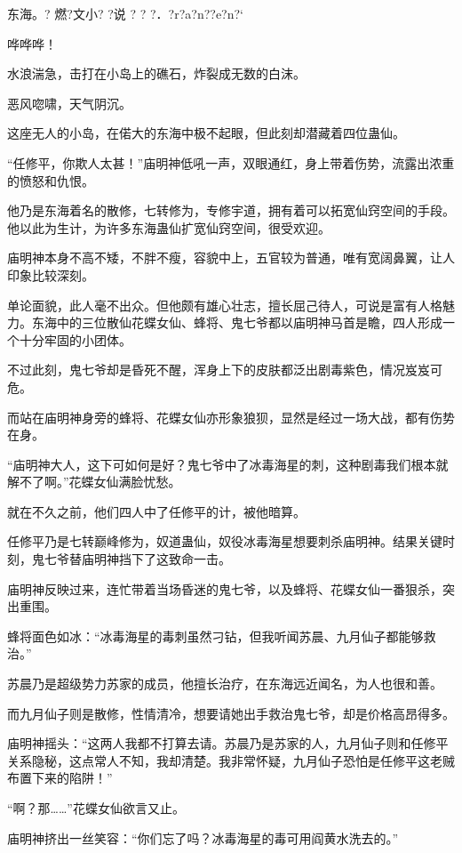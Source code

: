 
\begin{this_body}

东海。?  燃?文小? ?说  ? ? ?．?r?a?n??e?n?`

哗哗哗！

水浪湍急，击打在小岛上的礁石，炸裂成无数的白沫。

恶风唿啸，天气阴沉。

这座无人的小岛，在偌大的东海中极不起眼，但此刻却潜藏着四位蛊仙。

“任修平，你欺人太甚！”庙明神低吼一声，双眼通红，身上带着伤势，流露出浓重的愤怒和仇恨。

他乃是东海着名的散修，七转修为，专修宇道，拥有着可以拓宽仙窍空间的手段。他以此为生计，为许多东海蛊仙扩宽仙窍空间，很受欢迎。

庙明神本身不高不矮，不胖不瘦，容貌中上，五官较为普通，唯有宽阔鼻翼，让人印象比较深刻。

单论面貌，此人毫不出众。但他颇有雄心壮志，擅长屈己待人，可说是富有人格魅力。东海中的三位散仙花蝶女仙、蜂将、鬼七爷都以庙明神马首是瞻，四人形成一个十分牢固的小团体。

不过此刻，鬼七爷却是昏死不醒，浑身上下的皮肤都泛出剧毒紫色，情况岌岌可危。

而站在庙明神身旁的蜂将、花蝶女仙亦形象狼狈，显然是经过一场大战，都有伤势在身。

“庙明神大人，这下可如何是好？鬼七爷中了冰毒海星的刺，这种剧毒我们根本就解不了啊。”花蝶女仙满脸忧愁。

就在不久之前，他们四人中了任修平的计，被他暗算。

任修平乃是七转巅峰修为，奴道蛊仙，奴役冰毒海星想要刺杀庙明神。结果关键时刻，鬼七爷替庙明神挡下了这致命一击。

庙明神反映过来，连忙带着当场昏迷的鬼七爷，以及蜂将、花蝶女仙一番狠杀，突出重围。

蜂将面色如冰：“冰毒海星的毒刺虽然刁钻，但我听闻苏晨、九月仙子都能够救治。”

苏晨乃是超级势力苏家的成员，他擅长治疗，在东海远近闻名，为人也很和善。

而九月仙子则是散修，性情清冷，想要请她出手救治鬼七爷，却是价格高昂得多。

庙明神摇头：“这两人我都不打算去请。苏晨乃是苏家的人，九月仙子则和任修平关系隐秘，这点常人不知，我却清楚。我非常怀疑，九月仙子恐怕是任修平这老贼布置下来的陷阱！”

“啊？那……”花蝶女仙欲言又止。

庙明神挤出一丝笑容：“你们忘了吗？冰毒海星的毒可用阎黄水洗去的。”


\end{this_body}
